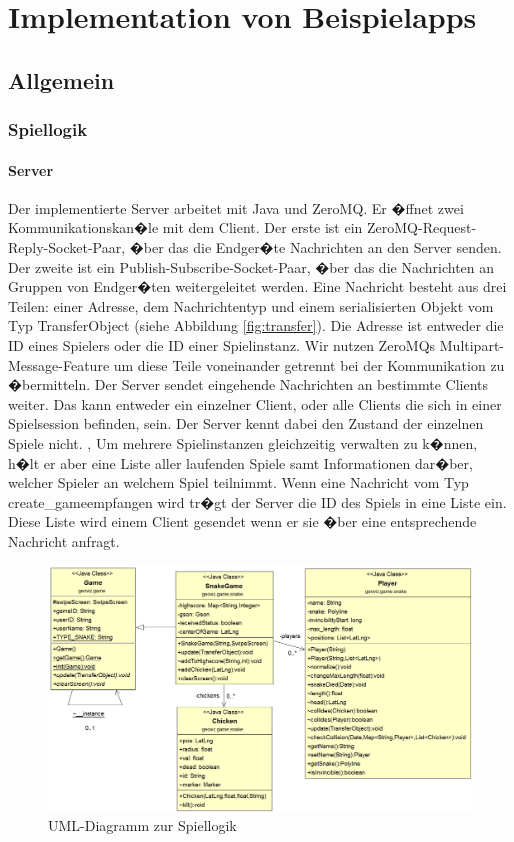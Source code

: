 \chapter{Implementation von Beispielapps}
\label{implementation}
\section{Allgemein}
\subsection{Spiellogik}
\subsubsection{Server}
Der implementierte Server arbeitet mit Java und ZeroMQ. Er �ffnet zwei Kommunikationskan�le mit dem Client. Der erste ist ein ZeroMQ-Request-Reply-Socket-Paar, �ber das die Endger�te Nachrichten an den Server senden. Der zweite ist ein Publish-Subscribe-Socket-Paar, �ber das die Nachrichten an Gruppen von Endger�ten weitergeleitet werden. Eine Nachricht besteht aus drei Teilen: einer Adresse, dem Nachrichtentyp und einem serialisierten Objekt vom Typ TransferObject (siehe Abbildung \ref{fig:transfer}). Die Adresse ist entweder die ID eines Spielers oder die ID einer Spielinstanz. Wir nutzen ZeroMQs Multipart-Message-Feature um diese Teile voneinander getrennt bei der Kommunikation zu �bermitteln. Der Server sendet eingehende Nachrichten an bestimmte Clients weiter. Das kann entweder ein einzelner Client, oder alle Clients die sich in einer Spielsession befinden, sein. Der Server kennt dabei den Zustand der einzelnen Spiele nicht. , Um mehrere Spielinstanzen gleichzeitig verwalten zu k�nnen, h�lt er aber eine Liste aller laufenden Spiele samt Informationen dar�ber, welcher Spieler an welchem Spiel teilnimmt. Wenn eine Nachricht vom Typ \glqq create\_game\grqq empfangen wird tr�gt der Server die ID des Spiels in eine Liste ein. Diese Liste wird einem Client gesendet wenn er sie �ber eine entsprechende Nachricht anfragt.



\begin{figure}
	\begin{center}
		\includegraphics[width=1\textwidth]{img/snake.png}
	\end{center}
	
	\caption{UML-Diagramm zur Spiellogik}
	\label{fig:snake}
\end{figure}

